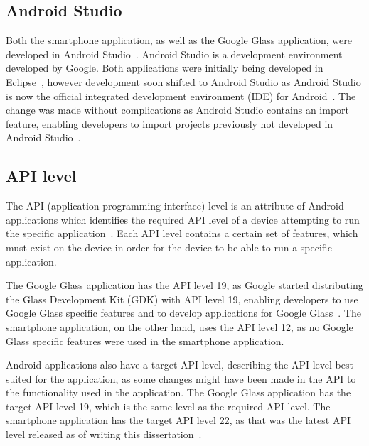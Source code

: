 

\subsection{Android Studio}
Both the smartphone application, as well as the Google Glass application, were developed in Android Studio~\cite{androidStudio}. Android Studio is a development environment developed by Google. Both applications were initially being developed in Eclipse~\cite{eclipse}, however development soon shifted to Android Studio as Android Studio is now the official integrated development environment (IDE) for Android~\cite{androidIDE}. The change was made without complications as Android Studio contains an import feature, enabling developers to import projects previously not developed in Android Studio~\cite{androidIDE}.

\subsection{API level}
The API (application programming interface) level is an attribute of Android applications which identifies the required API level of a device attempting to run the specific application~\cite{androidAPI}. Each API level contains a certain set of features, which must exist on the device in order for the device to be able to run a specific application.

The Google Glass application has the API level 19, as Google started distributing the Glass Development Kit (GDK) with API level 19, enabling developers to use Google Glass specific features and to develop applications for Google Glass~\cite{glassAPI}. The smartphone application, on the other hand, uses the API level 12, as no Google Glass specific features were used in the smartphone application.

Android applications also have a target API level, describing the API level best suited for the application, as some changes might have been made in the API to the functionality used in the application. The Google Glass application has the target API level 19, which is the same level as the required API level. The smartphone application has the target API level 22, as that was the latest API level released as of writing this dissertation~\cite{api22}.



